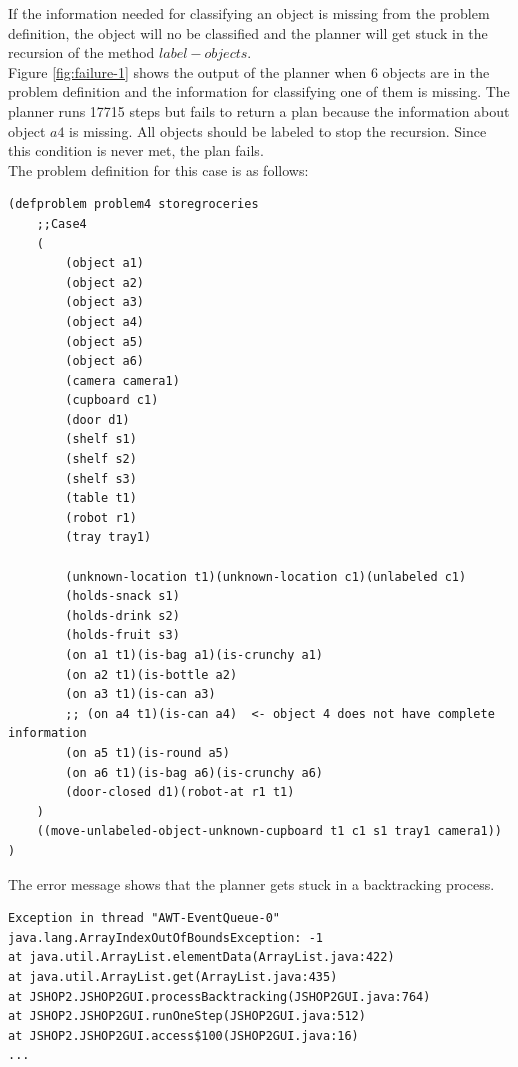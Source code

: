 \documentclass[paper=a4, fontsize=11pt]{scrartcl}
\begin{document}
	\vspace{5mm}
	
	If the information needed for classifying an object is missing from the problem definition, the object will no be classified and the planner will get stuck in the recursion of the method $label-objects$. \\
	
	Figure \ref{fig:failure-1} shows the output of the planner when 6 objects are in the problem definition and the information for classifying one of them is missing. The planner runs 17715 steps but fails to return a plan because the information about object $a4$ is missing. All objects should be labeled to stop the recursion. Since this condition is never met, the plan fails. \\
	
	The problem definition for this case is as follows: \\
	
	\begin{lstlisting}
(defproblem problem4 storegroceries
	;;Case4
	(
		(object a1)
		(object a2)
		(object a3)
		(object a4)
		(object a5)
		(object a6)
		(camera camera1)
		(cupboard c1)
		(door d1)
		(shelf s1)
		(shelf s2)
		(shelf s3)
		(table t1)
		(robot r1)
		(tray tray1)
		
		(unknown-location t1)(unknown-location c1)(unlabeled c1)
		(holds-snack s1)
		(holds-drink s2)
		(holds-fruit s3)
		(on a1 t1)(is-bag a1)(is-crunchy a1)
		(on a2 t1)(is-bottle a2)
		(on a3 t1)(is-can a3)
		;; (on a4 t1)(is-can a4)  <- object 4 does not have complete information
		(on a5 t1)(is-round a5)
		(on a6 t1)(is-bag a6)(is-crunchy a6)
		(door-closed d1)(robot-at r1 t1)
	)
	((move-unlabeled-object-unknown-cupboard t1 c1 s1 tray1 camera1))
)
	\end{lstlisting}
	
	\vspace{5mm}
	
	
	The error message shows that the planner gets stuck in a backtracking process. \\
	
	\begin{lstlisting}
Exception in thread "AWT-EventQueue-0" java.lang.ArrayIndexOutOfBoundsException: -1
at java.util.ArrayList.elementData(ArrayList.java:422)
at java.util.ArrayList.get(ArrayList.java:435)
at JSHOP2.JSHOP2GUI.processBacktracking(JSHOP2GUI.java:764)
at JSHOP2.JSHOP2GUI.runOneStep(JSHOP2GUI.java:512)
at JSHOP2.JSHOP2GUI.access$100(JSHOP2GUI.java:16)
...
	\end{lstlisting}
	
\end{document}
